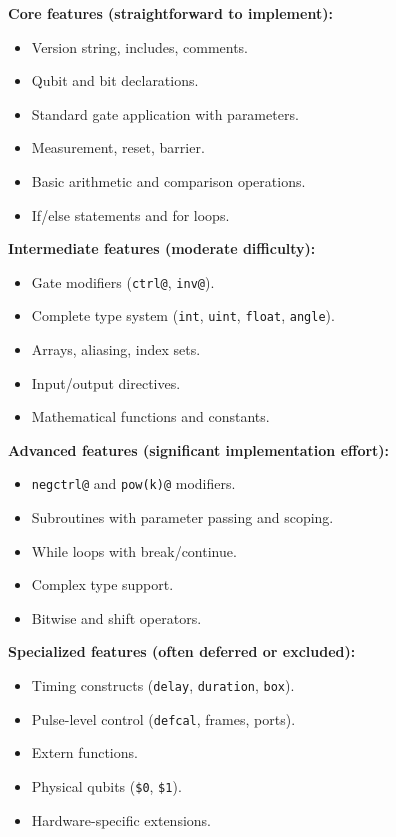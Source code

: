 \documentclass[journal]{IEEEtran}
\begin{document}
\textbf{Core features (straightforward to implement):}
\begin{itemize}
    \item Version string, includes, comments.
    \item Qubit and bit declarations.
    \item Standard gate application with parameters.
    \item Measurement, reset, barrier.
    \item Basic arithmetic and comparison operations.
    \item If/else statements and for loops.
\end{itemize}

\textbf{Intermediate features (moderate difficulty):}
\begin{itemize}
    \item Gate modifiers (\texttt{ctrl@}, \texttt{inv@}).
    \item Complete type system (\texttt{int}, \texttt{uint}, \texttt{float}, \texttt{angle}).
    \item Arrays, aliasing, index sets.
    \item Input/output directives.
    \item Mathematical functions and constants.
\end{itemize}

\textbf{Advanced features (significant implementation effort):}
\begin{itemize}
    \item \texttt{negctrl@} and \texttt{pow(k)@} modifiers.
    \item Subroutines with parameter passing and scoping.
    \item While loops with break/continue.
    \item Complex type support.
    \item Bitwise and shift operators.
\end{itemize}

\textbf{Specialized features (often deferred or excluded):}
\begin{itemize}
    \item Timing constructs (\texttt{delay}, \texttt{duration}, \texttt{box}).
    \item Pulse-level control (\texttt{defcal}, frames, ports).
    \item Extern functions.
    \item Physical qubits (\texttt{\$0}, \texttt{\$1}).
    \item Hardware-specific extensions.
\end{itemize}
\end{document}

